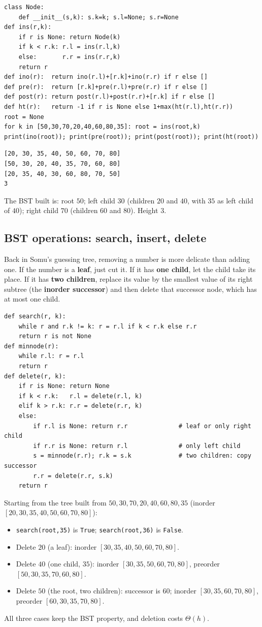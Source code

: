 \documentclass[11pt,a4paper]{article}
\newcommand{\py}[1]{\texttt{#1}}
\begin{document}
\begin{lstlisting}
class Node:
    def __init__(s,k): s.k=k; s.l=None; s.r=None
def ins(r,k):
    if r is None: return Node(k)
    if k < r.k: r.l = ins(r.l,k)
    else:       r.r = ins(r.r,k)
    return r
def ino(r):  return ino(r.l)+[r.k]+ino(r.r) if r else []
def pre(r):  return [r.k]+pre(r.l)+pre(r.r) if r else []
def post(r): return post(r.l)+post(r.r)+[r.k] if r else []
def ht(r):   return -1 if r is None else 1+max(ht(r.l),ht(r.r))
root = None
for k in [50,30,70,20,40,60,80,35]: root = ins(root,k)
print(ino(root)); print(pre(root)); print(post(root)); print(ht(root))
\end{lstlisting}
\begin{lstlisting}[style=out]
[20, 30, 35, 40, 50, 60, 70, 80]
[50, 30, 20, 40, 35, 70, 60, 80]
[20, 35, 40, 30, 60, 80, 70, 50]
3
\end{lstlisting}
The BST built is: root $50$; left child $30$ (children $20$ and $40$, with $35$ as left child of $40$); right child $70$ (children $60$ and $80$). Height $3$.


\subsection{BST operations: search, insert, delete}
\begin{story}
Back in Somu's guessing tree, removing a number is more delicate than adding one. If the number is a \textbf{leaf}, just cut it. If it has \textbf{one child}, let the child take its place. If it has \textbf{two children}, replace its value by the smallest value of its right subtree (the \textbf{inorder successor}) and then delete that successor node, which has at most one child.
\end{story}
\begin{lstlisting}
def search(r, k):
    while r and r.k != k: r = r.l if k < r.k else r.r
    return r is not None
def minnode(r):
    while r.l: r = r.l
    return r
def delete(r, k):
    if r is None: return None
    if k < r.k:   r.l = delete(r.l, k)
    elif k > r.k: r.r = delete(r.r, k)
    else:
        if r.l is None: return r.r              # leaf or only right child
        if r.r is None: return r.l              # only left child
        s = minnode(r.r); r.k = s.k             # two children: copy successor
        r.r = delete(r.r, s.k)
    return r
\end{lstlisting}
Starting from the tree built from $50,30,70,20,40,60,80,35$ (inorder $[20,30,35,40,50,60,70,80]$):
\begin{itemize}[noitemsep]
\item \py{search(root,35)} is \py{True}; \py{search(root,36)} is \py{False}.
\item Delete $20$ (a leaf): inorder $[30,35,40,50,60,70,80]$.
\item Delete $40$ (one child, $35$): inorder $[30,35,50,60,70,80]$, preorder $[50,30,35,70,60,80]$.
\item Delete $50$ (the root, two children): successor is $60$; inorder $[30,35,60,70,80]$, preorder $[60,30,35,70,80]$.
\end{itemize}
All three cases keep the BST property, and deletion costs $\Theta(h)$.
\end{document}
